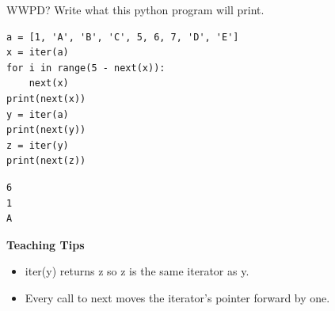\begin{blocksection}
    \question WWPD? Write what this python program will print.
    
    \begin{lstlisting}
a = [1, 'A', 'B', 'C', 5, 6, 7, 'D', 'E']
x = iter(a)
for i in range(5 - next(x)):
    next(x)
print(next(x))
y = iter(a)
print(next(y))
z = iter(y)
print(next(z))
\end{lstlisting}
    
    \begin{solution}[0.7in]
    \begin{lstlisting}
6
1
A
\end{lstlisting}
    \end{solution}
\end{blocksection}
    
    \begin{guide}
    \begin{blocksection}
        \textbf{Teaching Tips}
        \begin{itemize}
        \item iter(y) returns z so z is the same iterator as y.
        \item Every call to next moves the iterator's pointer forward by one.
        \end{itemize}
    \end{blocksection}
    \end{guide}